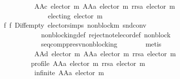 \begin{isabellebody}
\ \ \ \ \ \ \ \ \ \ AAc\ {\isacharparenleft}{\kern0pt}elector\ m\ {\isacharparenleft}{\kern0pt}AAa\ {\isacharparenleft}{\kern0pt}elector\ m{\isacharparenright}{\kern0pt}{\isacharparenright}{\kern0pt}\ {\isacharparenleft}{\kern0pt}rrsa\ {\isacharparenleft}{\kern0pt}elector\ m{\isacharparenright}{\kern0pt}{\isacharparenright}{\kern0pt}{\isacharparenright}{\kern0pt}\ {\isasymlongrightarrow}\isanewline
\ \ \ \ \ \ \ \ \ \ \ \ \ \ electing\ {\isacharparenleft}{\kern0pt}elector\ m{\isacharparenright}{\kern0pt}{\isachardoublequoteclose}\isanewline
\ \ \ \ \ \ \isamarkupfalse%
\ f{}\ f{}\ Diff{\isacharunderscore}{\kern0pt}empty\ elector{\isachardot}{\kern0pt}simps\ non{\isacharunderscore}{\kern0pt}block{\isacharunderscore}{\kern0pt}m\ snd{\isacharunderscore}{\kern0pt}conv\isanewline
\ \ \ \ \ \ \ \ \ \ \ \ non{\isacharunderscore}{\kern0pt}blocking{\isacharunderscore}{\kern0pt}def\ reject{\isacharunderscore}{\kern0pt}not{\isacharunderscore}{\kern0pt}elec{\isacharunderscore}{\kern0pt}or{\isacharunderscore}{\kern0pt}def\ non{\isacharunderscore}{\kern0pt}block\isanewline
\ \ \ \ \ \ \ \ \ \ \ \ seq{\isacharunderscore}{\kern0pt}comp{\isacharunderscore}{\kern0pt}presv{\isacharunderscore}{\kern0pt}non{\isacharunderscore}{\kern0pt}blocking\isanewline
\ \ \ \ \ \ \isamarkupfalse%
\ metis\isanewline
\ \ \ \ \isamarkupfalse%
\isanewline
\ \ \ \ \isacommand{{\isacharbraceleft}{\kern0pt}}\isamarkupfalse%
\isanewline
\ \ \ \ \ \ \isamarkupfalse%
\isanewline
\ \ \ \ \ \ \ \ {\isachardoublequoteopen}{\isacharbraceleft}{\kern0pt}{\isacharbraceright}{\kern0pt}\ {\isasymnoteq}\ AAd\ {\isacharparenleft}{\kern0pt}elector\ m\ {\isacharparenleft}{\kern0pt}AAa\ {\isacharparenleft}{\kern0pt}elector\ m{\isacharparenright}{\kern0pt}{\isacharparenright}{\kern0pt}\ {\isacharparenleft}{\kern0pt}rrsa\ {\isacharparenleft}{\kern0pt}elector\ m{\isacharparenright}{\kern0pt}{\isacharparenright}{\kern0pt}{\isacharparenright}{\kern0pt}{\isachardoublequoteclose}\isanewline
\ \ \ \ \ \ \isamarkupfalse%
\isanewline
\ \ \ \ \ \ \ \ {\isachardoublequoteopen}{\isasymnot}\ profile\ {\isacharparenleft}{\kern0pt}AAa\ {\isacharparenleft}{\kern0pt}elector\ m{\isacharparenright}{\kern0pt}{\isacharparenright}{\kern0pt}\ {\isacharparenleft}{\kern0pt}rrsa\ {\isacharparenleft}{\kern0pt}elector\ m{\isacharparenright}{\kern0pt}{\isacharparenright}{\kern0pt}\ {\isasymor}\isanewline
\ \ \ \ \ \ \ \ \ \ infinite\ {\isacharparenleft}{\kern0pt}AAa\ {\isacharparenleft}{\kern0pt}elector\ m{\isacharparenright}{\kern0pt}{\isacharparenright}{\kern0pt}{\isachardoublequoteclose}\isanewline

\end{isabellebody}

